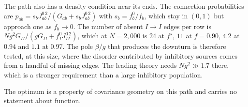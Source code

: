 \documentclass[11pt]{article}
\begin{document}
The path also has a density condition near its ends. The connection probabilities are $p_{ab}=s_bJ^{0\,2}_{ab}/(G_{ab}+s_bJ^{0\,2}_{ab})$ with $s_b=f_b^0/f_b$, which stay in $(0,1)$ but approach one as $f_b\to0$. The number of absent $I\to I$ edges per row is $Ng^2G_{II}/(gG_{II}+f_I^0J^{0\,2}_{II})$, which at $N=2{,}000$ is $24$ at $f^\star$, $11$ at $f=0.90$, $4.2$ at $0.94$ and $1.1$ at $0.97$. The pole $\beta/g$ that produces the downturn is therefore tested, at this size, where the disorder contributed by inhibitory sources comes from a handful of missing edges. The leading theory needs $Ng^2\gg1.7$ there, which is a stronger requirement than a large inhibitory population.

The optimum is a property of covariance geometry on this path and carries no statement about function.
\end{document}
